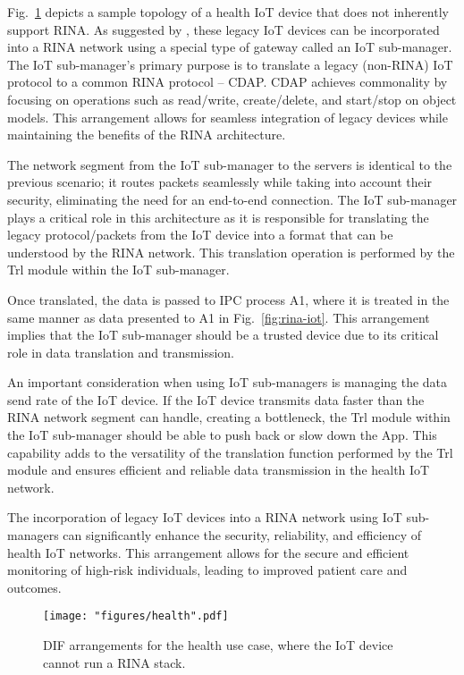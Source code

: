 \documentclass{ieeeaccess}
\begin{document}
Fig.~\ref{fig:rina-health} depicts a sample topology of a health IoT device that does not inherently support RINA. As suggested by \cite{maryan2020}, these legacy IoT devices can be incorporated into a RINA network using a special type of gateway called an IoT sub-manager. The IoT sub-manager's primary purpose is to translate a legacy (non-RINA) IoT protocol to a common RINA protocol – CDAP. CDAP achieves commonality by focusing on operations such as read/write, create/delete, and start/stop on object models. This arrangement allows for seamless integration of legacy devices while maintaining the benefits of the RINA architecture.

The network segment from the IoT sub-manager to the servers is identical to the previous scenario; it routes packets seamlessly while taking into account their security, eliminating the need for an end-to-end connection. The IoT sub-manager plays a critical role in this architecture as it is responsible for translating the legacy protocol/packets from the IoT device into a format that can be understood by the RINA network. This translation operation is performed by the Trl module within the IoT sub-manager.

Once translated, the data is passed to IPC process A1, where it is treated in the same manner as data presented to A1 in Fig.~\ref{fig:rina-iot}. This arrangement implies that the IoT sub-manager should be a trusted device due to its critical role in data translation and transmission.

An important consideration when using IoT sub-managers is managing the data send rate of the IoT device. If the IoT device transmits data faster than the RINA network segment can handle, creating a bottleneck, the Trl module within the IoT sub-manager should be able to push back or slow down the App. This capability adds to the versatility of the translation function performed by the Trl module and ensures efficient and reliable data transmission in the health IoT network.

The incorporation of legacy IoT devices into a RINA network using IoT sub-managers can significantly enhance the security, reliability, and efficiency of health IoT networks. This arrangement allows for the secure and efficient monitoring of high-risk individuals, leading to improved patient care and outcomes.


\begin{figure}[!t]
	\centering
	\texttt{[image: "figures/health".pdf]}
	\caption{DIF arrangements for the health use case, where the IoT device cannot run a RINA stack.}
	\label{fig:rina-health}
\end{figure}
\end{document}
